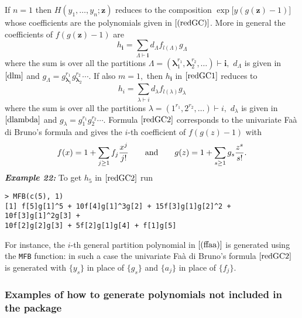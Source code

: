 If \(n=1\) then \(H(y_1, \ldots, y_n; \boldsymbol{z})\) reduces to the
composition \(\exp \big[ y (g(\boldsymbol{z})-1)]\) whose coefficients
are the polynomials given in \(\eqref{(redGC)}\). More in general the
coefficients of \(f(g(\boldsymbol{z})-1)\) are \begin{equation}
h_{\boldsymbol{i}} =  \sum_{{\Lambda} \vdash  \boldsymbol{i}} d_{\Lambda}  f_{l(\Lambda)} 
g_{\Lambda}
\label{redGC1}
\end{equation} where the sum is over all the partitions
\(\Lambda=(\boldsymbol{\lambda}_1^{r_1} , \boldsymbol{\lambda}_2^{r_2}, \ldots) \vdash \boldsymbol{i},\)
\(d_{\Lambda}\) is given in \(\eqref{dlm}\) and
\(g_{\Lambda} = g_{\boldsymbol{\lambda}_1}^{r_1} g_{\boldsymbol{\lambda}_2}^{r_2} \cdots.\)
If also \(m=1,\) then \(h_{\boldsymbol{i}}\) in \(\eqref{redGC1}\)
reduces to \begin{equation}
h_{i} =  \sum_{{\lambda} \vdash  i} d_{\lambda}  f_{l(\lambda)} 
g_{\lambda}
\label{redGC2}
\end{equation} where the sum is over all the partitions
\(\lambda=(1^{r_1} , 2^{r_2}, \ldots) \vdash i,\) \(d_{\lambda}\) is
given in \(\eqref{dlambda}\) and
\(g_{\lambda} = g_1^{r_1} g_{2}^{r_2} \cdots.\) Formula
\(\eqref{redGC2}\) corresponds to the univariate Faà di Bruno's formula
and gives the \(i\)-th coefficient of \(f(g(z)-1)\) with
\[f(x)=1+\sum_{j \geq 1} f_j \frac{x^j}{j!} \qquad \hbox{and} \qquad g(z)=1+\sum_{s \geq 1} g_s \frac{z^s}{s!}.\]
\textbf{\emph{Example 22:}} To get \(h_{5}\) in \(\eqref{redGC2}\) run

\begin{verbatim}
> MFB(c(5), 1)
[1] f[5]g[1]^5 + 10f[4]g[1]^3g[2] + 15f[3]g[1]g[2]^2 + 10f[3]g[1]^2g[3] + 
10f[2]g[2]g[3] + 5f[2]g[1]g[4] + f[1]g[5]
\end{verbatim}

For instance, the \(i\)-th general partition polynomial in
\(\eqref{(ffaa)}\) is generated using the \texttt{MFB} function: in such
a case the univariate Faà di Bruno's formula \(\eqref{redGC2}\) is
generated with \(\{y_s\}\) in place of \(\{g_s\}\) and \(\{a_j\}\) in
place of \(\{f_j\}.\)

\hypertarget{examples-of-how-to-generate-polynomials-not-included-in-the-package}{%
\subsubsection{\texorpdfstring{Examples of how to generate polynomials
not included in the 
package}{Examples of how to generate polynomials not included in the  package}}\label{examples-of-how-to-generate-polynomials-not-included-in-the-package}}


